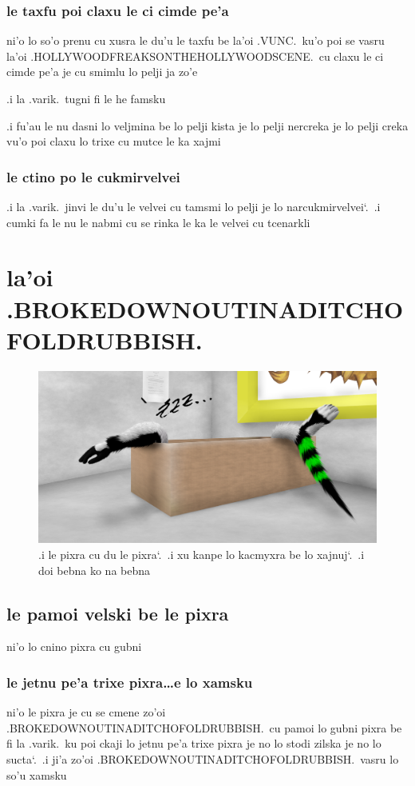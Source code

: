 \documentclass{report}
\newcommand\sds{\spacefactor\sfcode`.\ \space}
\begin{document}
\subsection{le taxfu poi claxu le ci cimde pe'a}
ni'o lo so'o prenu cu xusra le du'u le taxfu be la'oi .VUNC.\ ku'o poi se vasru la'oi .HOLLYWOODFREAKSONTHEHOLLYWOODSCENE.\ cu claxu le ci cimde pe'a je cu smimlu lo pelji ja zo'e

.i la .varik.\ tugni fi le he famsku

.i fu'au le nu dasni lo veljmina be lo pelji kista je lo pelji nercreka je lo pelji creka vu'o poi claxu lo trixe cu mutce le ka xajmi

\subsection{le ctino po le cukmirvelvei}
.i la .varik.\ jinvi le du'u le velvei cu tamsmi lo pelji je lo narcukmirvelvei\sds  .i cumki fa le nu le nabmi cu se rinka le ka le velvei cu tcenarkli

\chapter{la'oi .BROKEDOWNOUTINADITCHOFOLDRUBBISH.}
\begin{figure}[ht]
	\centering
	\includegraphics[width=\textwidth]{brokedownoutinaditchofoldrubbish/brokedownoutinaditchofoldrubbish.png}
	\caption[center]{.i le pixra cu du le pixra\sds  .i xu kanpe lo kacmyxra be lo xajnuj\sds  .i doi bebna ko na bebna}
\end{figure}
\section{le pamoi velski be le pixra}
ni'o lo cnino pixra cu gubni

\subsection{le jetnu pe'a trixe pixra\ldots e lo xamsku}
ni'o le pixra je cu se cmene zo'oi .BROKEDOWNOUTINADITCHOFOLDRUBBISH.\ cu pamoi lo gubni pixra be fi la .varik.\ ku poi ckaji lo jetnu pe'a trixe pixra je no lo stodi zilska je no lo sucta\sds  .i ji'a zo'oi .BROKEDOWNOUTINADITCHOFOLDRUBBISH.\ vasru lo so'u xamsku
\end{document}

